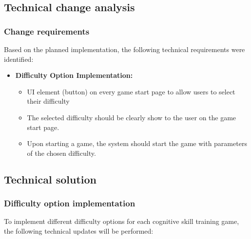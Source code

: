 \documentclass[11pt,a4paper]{article}
\begin{document}





\begin{comment}


    sita dedam ar ne? Jo, dedam.
\end{comment}

\subsection{Technical change analysis}
\subsubsection{Change requirements}
Based on the planned implementation, the following technical requirements were identified:

\begin{itemize}
    \item  \textbf{Difficulty Option Implementation:}
    \begin{itemize}
        \item UI element (button) on every game start page to allow users to select their difficulty
        \item The selected difficulty should be clearly show to the user on the game start page.
        \item Upon starting a game, the system should start the game with parameters of the chosen difficulty.
    \end{itemize}
\end{itemize}

\subsection{Technical solution}
\subsubsection{Difficulty option implementation}
To implement different difficulty options for each cognitive skill training game, the following technical updates will be performed:
\end{document}
